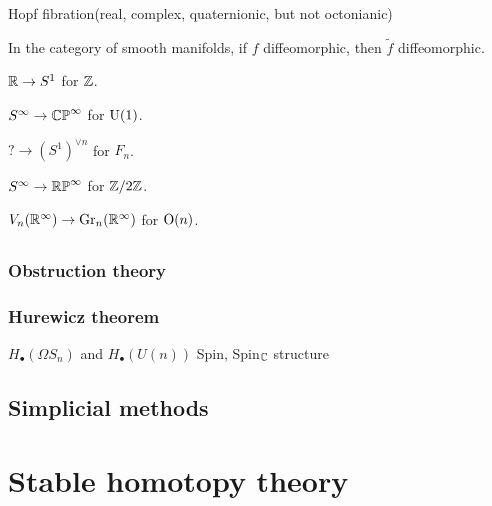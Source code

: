 \documentclass{../../large}
\begin{document}
Hopf fibration(real, complex, quaternionic, but not octonianic)

In the category of smooth manifolds, if $f$ diffeomorphic, then $\tilde f$ diffeomorphic.



\begin{prb}
\begin{parts}
\item $\mathbb{R}\to S^1$ for $\mathbb{Z}$.
\item $S^\infty\to\mathbb{CP}^\infty$ for $\mathrm{U}(1)$.
\item $?\to(S^1)^{\vee n}$ for $F_n$.
\item $S^\infty\to\mathbb{RP}^\infty$ for $\mathbb{Z}/2\mathbb{Z}$.
\item $V_n(\mathbb{R}^\infty)\to\mathrm{Gr}_n(\mathbb{R}^\infty)$ for $\mathrm{O}(n)$.
\end{parts}
\end{prb}





\chapter{}

\section{Obstruction theory}
\section{Hurewicz theorem}
$H_\bullet(\Omega S_n)$ and $H_\bullet(U(n))$
Spin, Spin$_{\mathbb{C}}$ structure




\chapter{Simplicial methods}












\part{Stable homotopy theory}


\chapter{}
\end{document}
